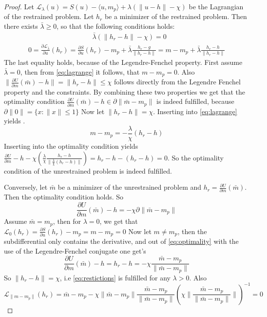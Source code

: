 \documentclass[12pt]{article}
\begin{document}
\begin{proof}
Let $\mathcal L_\lambda(u) = S(u) - \langle u,m_p \rangle + \lambda(\|u - h\| - \chi)$ be the Lagrangian of the restrained problem. 
Let $h_r$ be a minimizer of the restrained problem. Then there exists $\bar \lambda \geq 0$, so that the following conditions holds:
\begin{align}\label{eq:restictions}
    &\bar \lambda (\|h_r - h\| - \chi) = 0
\end{align}
\begin{align}\label{eq:lagrange}
    0 = \frac{\partial \mathcal L_{\bar \lambda}}{\partial u}(h_r) = \frac{\partial S}{\partial u}(h_r) - m_p + \bar \lambda \frac{h_r - g}{\|h_r - h\|} = m - m_p +\bar \lambda\frac{h_r -  h}{\|h_r - h\|}
\end{align}
The last equality holds, because of the Legendre-Fenchel property. 
First assume $\bar \lambda = 0$, then from \eqref{eq:lagrange} it follows, that $m-m_p = 0$. Also $\|\frac{\partial U}{\partial m}(\bar m) - h\| =\|h_r - h\| \leq \chi$ follows directly from the Legendre Fenchel property and the constraints. By combining these two properties we get that the optimality condition $\frac{\partial U}{\partial m}(\bar m) - h \in \partial \|\bar m - m_p\|$ is indeed fulfilled, because $\partial \|0\| = \{x \colon \|x\| \leq 1\}$
Now let $\|h_r - h\| = \chi$. Inserting into \eqref{eq:lagrange} yields .$$m - m_p = - \frac{\lambda}{\chi}(h_r - h)$$
Inserting into the optimality condition yields $\frac{\partial U}{\partial m} - h - \chi (\frac{\lambda}{\chi} \frac{h_r - h}{\|\frac{\lambda}{\chi} (h_r - h) \|}) = h_r  - h - (h_r - h) = 0$. So the optimality condition of the unrestrained problem is indeed fulfilled.

Conversely, let $\bar m$ be a minimizer of the unrestrained problem and $h_r = \frac{\partial U}{\partial m}(\bar m)$. Then the optimality condition holds. So \begin{equation}\label{eq:optimality}
    \frac{\partial U}{\partial m}(\bar m) - h = - \chi \partial\|\bar m - m_p\|
\end{equation}
Assume $\bar m = m_p$, then for $\lambda = 0$, we get that $\mathcal L_0(h_r) = \frac{\partial S}{\partial u}(h_r) - m_p = m - m_p = 0$
Now let $m \neq m_p$, then the subdifferential only contains the derivative, and out of \eqref{eq:optimality} with the use of the Legendre-Fenchel conjugate one get's \begin{equation}
   \frac{\partial U}{\partial m}(\bar m) - h = h_r - h = - \chi \frac{\bar m - m_p}{\|\bar m - m_p\|}
\end{equation}
So $\|h_r - h\| = \chi$, i.e \eqref{eq:restictions} is fulfilled for any $\lambda > 0$.  Also $$\mathcal L_{\|m - m_p\|}(h_r) =\bar m - m_p - \chi \|\bar m - m_p\|\frac{\bar m - m_p}{\|\bar m - m_p\|} (\chi \|\frac{\bar m - m_p}{\|\bar m - m_p\|}\|)^{-1} = 0$$
\end{proof}

\printbibliography
\end{document}
